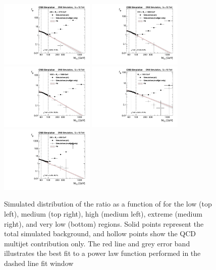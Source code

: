 \begin{figure}
	\centering
	\includegraphics[width=0.4\textwidth]{backgrounds/figs/ratio_HT450to575_j2toInf_b0toInf}
	\includegraphics[width=0.4\textwidth]{backgrounds/figs/ratio_HT575to1000_j2toInf_b0toInf}
	\includegraphics[width=0.4\textwidth]{backgrounds/figs/ratio_HT1000to1500_j2toInf_b0toInf}
	\includegraphics[width=0.4\textwidth]{backgrounds/figs/ratio_HT1500toInf_j2toInf_b0toInf}
	\includegraphics[width=0.4\textwidth]{backgrounds/figs/ratio_HT250to450_j2toInf_b0toInf}
	\renewcommand{\baselinestretch}{1.0}
	\caption[Simulated distribution of the \rphi ratio as a function of \mttwo for the low (top left), medium (top right), high (medium left), extreme (medium right), and very low (bottom) \HT regions.]{Simulated distribution of the \rphi ratio as a function of \mttwo for the low (top left), medium (top right), high (medium left), extreme (medium right), and very low (bottom) \HT regions. Solid points represent the total simulated background, and hollow points show the QCD multijet contribution only. The red line and grey error band illustrates the best fit to a power law function performed in the dashed line fit window}
	\label{fig:rphiDependence}
\end{figure}

